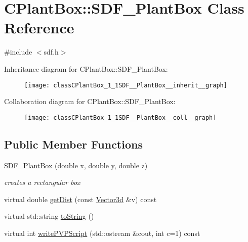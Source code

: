 \hypertarget{classCPlantBox_1_1SDF__PlantBox}{}\section{C\+Plant\+Box\+:\+:S\+D\+F\+\_\+\+Plant\+Box Class Reference}
\label{classCPlantBox_1_1SDF__PlantBox}


{\ttfamily \#include $<$sdf.\+h$>$}



Inheritance diagram for C\+Plant\+Box\+:\+:S\+D\+F\+\_\+\+Plant\+Box\+:\nopagebreak
\begin{figure}[H]
\begin{center}
\leavevmode
\texttt{[image: classCPlantBox\_1\_1SDF\_\_PlantBox\_\_inherit\_\_graph]}
\end{center}
\end{figure}


Collaboration diagram for C\+Plant\+Box\+:\+:S\+D\+F\+\_\+\+Plant\+Box\+:\nopagebreak
\begin{figure}[H]
\begin{center}
\leavevmode
\texttt{[image: classCPlantBox\_1\_1SDF\_\_PlantBox\_\_coll\_\_graph]}
\end{center}
\end{figure}
\subsection*{Public Member Functions}
\begin{DoxyCompactItemize}
\item 
\hyperlink{classCPlantBox_1_1SDF__PlantBox_a50134597ed4be0df51a41a70128378b7}{S\+D\+F\+\_\+\+Plant\+Box} (double x, double y, double z)
\begin{DoxyCompactList}\small\item\em creates a rectangular box \end{DoxyCompactList}\item 
virtual double \hyperlink{classCPlantBox_1_1SDF__PlantBox_a0e618e485263f3006c19acbca920b78f}{get\+Dist} (const \hyperlink{classCPlantBox_1_1Vector3d}{Vector3d} \&v) const
\item 
virtual std\+::string \hyperlink{classCPlantBox_1_1SDF__PlantBox_af7c53cdbb174e253799444c00503b354}{to\+String} ()
\item 
virtual int \hyperlink{classCPlantBox_1_1SDF__PlantBox_a077239ab725f28c5a85e0e27749cc532}{write\+P\+V\+P\+Script} (std\+::ostream \&cout, int c=1) const
\end{DoxyCompactItemize}


